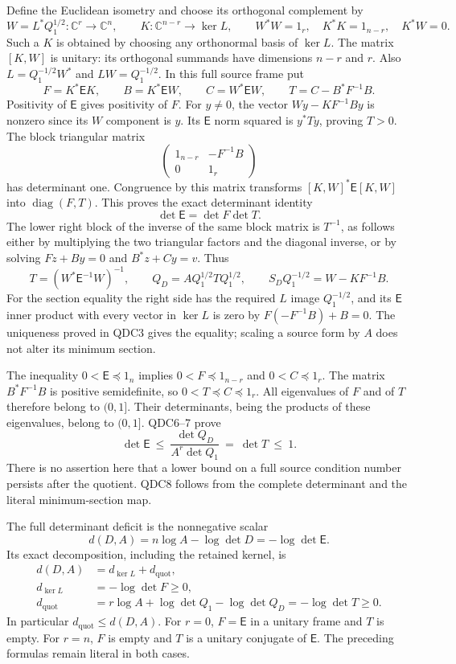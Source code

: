 Define the Euclidean isometry and choose its orthogonal complement
by
\[
 W=L^*Q_1^{1/2}:\mathbb C^r\longrightarrow\mathbb C^n,\qquad
 K:\mathbb C^{n-r}\longrightarrow\ker L,\qquad
 W^*W=1_r,\quad K^*K=1_{n-r},\quad K^*W=0.
 \tag{QDC4}
\]
Such a $K$ is obtained by choosing any orthonormal basis of $\ker L$.
The matrix $[K,W]$ is unitary: its orthogonal summands have dimensions
$n-r$ and $r$. Also
$L=Q_1^{-1/2}W^*$ and $LW=Q_1^{-1/2}$.
In this full source frame put
\[
 F=K^*\mathsf EK,\qquad B=K^*\mathsf EW,\qquad
 C=W^*\mathsf EW,\qquad T=C-B^*F^{-1}B.
 \tag{QDC5}
\]
Positivity of $\mathsf E$ gives positivity of $F$. For $y\ne0$,
the vector $W y-KF^{-1}By$ is nonzero since its $W$ component is
$y$. Its $\mathsf E$ norm squared is $y^*Ty$, proving $T>0$.
The block triangular matrix
\[
 \begin{pmatrix}1_{n-r}&-F^{-1}B\\0&1_r\end{pmatrix}
\]
has determinant one. Congruence by this matrix transforms
$[K,W]^*\mathsf E[K,W]$ into $\operatorname{diag}(F,T)$.
This proves the exact determinant identity
\[
 \det\mathsf E=\det F\det T .
 \tag{QDC6}
\]
The lower right block of the inverse of the same block matrix is
$T^{-1}$, as follows either by multiplying the two triangular
factors and the diagonal inverse, or by solving
$Fz+By=0$ and $B^*z+Cy=v$. Thus
\[
 T=(W^*\mathsf E^{-1}W)^{-1},\qquad
 Q_D=AQ_1^{1/2}TQ_1^{1/2},\qquad
 S_DQ_1^{-1/2}=W-KF^{-1}B .
 \tag{QDC7}
\]
For the section equality the right side has the required $L$ image
$Q_1^{-1/2}$, and its $\mathsf E$ inner product with every vector
in $\ker L$ is zero by $F(-F^{-1}B)+B=0$. The uniqueness proved
in QDC3 gives the equality; scaling a source form by $A$ does not
alter its minimum section.

The inequality $0<\mathsf E\preceq1_n$ implies
$0<F\preceq1_{n-r}$ and $0<C\preceq1_r$. The matrix
$B^*F^{-1}B$ is positive semidefinite, so
$0<T\preceq C\preceq1_r$. All eigenvalues of $F$ and of $T$
therefore belong to $(0,1]$. Their determinants, being the products
of these eigenvalues, belong to $(0,1]$. QDC6--7 prove
\[
 \boxed{\displaystyle
 \det\mathsf E
 \ \le\ \frac{\det Q_D}{A^r\det Q_1}
 \ =\ \det T\ \le\ 1 .}
 \tag{QDC8}
\]
There is no assertion here that a lower bound on a full source
condition number persists after the quotient. QDC8 follows from
the complete determinant and the literal minimum-section map.

The full determinant deficit is the nonnegative scalar
\[
 d(D,A)=n\log A-\log\det D=-\log\det\mathsf E.
 \tag{QDC9}
\]
Its exact decomposition, including the retained kernel, is
\[
 \begin{split}
 d(D,A)&=d_{\ker L}+d_{\mathrm{quot}},\\
 d_{\ker L}&=-\log\det F\ge0,\\
 d_{\mathrm{quot}}
 &=r\log A+\log\det Q_1-\log\det Q_D
   =-\log\det T\ge0.
 \end{split}
 \tag{QDC10}
\]
In particular $d_{\mathrm{quot}}\le d(D,A)$.
For $r=0$, $F=\mathsf E$ in a unitary frame and $T$ is empty.
For $r=n$, $F$ is empty and $T$ is a unitary conjugate of
$\mathsf E$. The preceding formulas remain literal in both cases.

